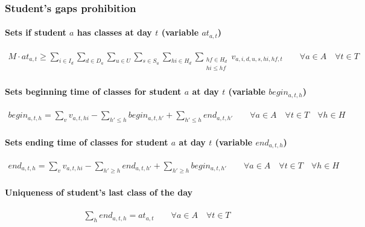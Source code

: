 \subsubsection{Student's gaps prohibition}
\label{constrStudentGap}

\paragraph{Sets if student $a$ has classes at day $t$ (variable $at_{a,t}$)}
\begin{eqnarray}
M \cdot at_{a,t} \ge \sum\limits_{i \in I_{d}} \sum\limits_{d \in D_{a}} \sum\limits_{u \in U} \sum\limits_{s \in S_{u}} \sum\limits_{hi \in H_{d}} \sum_{\substack {hf \in H_{d} \\ hi\le hf}} v_{a,i,d,u,s,hi,hf,t} \nonumber \qquad 
\forall a \in A \quad
\forall t \in T
\end{eqnarray}

\paragraph{Sets beginning time of classes for student $a$ at day $t$ (variable $begin_{a,t,h}$)}
\begin{eqnarray}
begin_{a,t,h} = \sum\limits_{v} v_{a,t,hi} - \sum\limits_{h'\le h} begin_{a,t,h'} + \sum\limits_{h'\le h} end_{a,t,h'} \nonumber \qquad
\forall a \in A \quad
\forall t \in T \quad
\forall h \in H
\end{eqnarray}

\paragraph{Sets ending time of classes for student $a$ at day $t$ (variable $end_{a,t,h}$)}
\begin{eqnarray}
end_{a,t,h} = \sum\limits_{v} v_{a,t,hi} - \sum\limits_{h'\ge h} end_{a,t,h'} + \sum\limits_{h'\ge h} begin_{a,t,h'} \nonumber \qquad
\forall a \in A \quad
\forall t \in T \quad
\forall h \in H
\end{eqnarray}

\paragraph{Uniqueness of student's last class of the day}
\begin{eqnarray}
\sum\limits_{h} end_{a,t,h} = at_{a,t} \nonumber \qquad
\forall a \in A \quad
\forall t \in T
\end{eqnarray}

